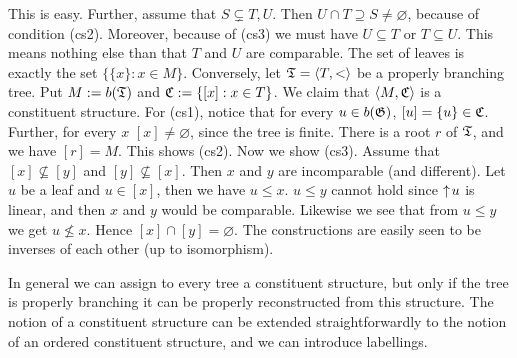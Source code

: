 This is easy. Further, assume that $S \subsetneq T, U$. Then
$U \cap T \supseteq S \neq \varnothing$, because of condition (cs2).
Moreover, because of (cs3) we must have $U \subseteq T$ or $T \subseteq U$.
This means nothing else than that $T$ and $U$ are comparable. The set
of leaves is exactly the set $\{\{x\} : x \in M\}$. Conversely, let
$\mathfrak{T} = \langle T, <\rangle$ be a properly branching tree. Put
$M := b(\mathfrak{T})$ and $\mathfrak{C} := \{[x] : x \in T\}$.  We claim that 
$\langle M, \mathfrak{C}\rangle$ is a constituent structure. For (cs1),
notice that for every $u \in b(\mathfrak{G})$, $[u] = \{u\} \in \mathfrak{C}$.
Further, for every $x$ $[x] \neq \varnothing$, since the tree is finite.
There is a root $r$ of $\mathfrak{T}$, and we have $[r] = M$. This shows
(cs2). Now we show (cs3). Assume that $[x] \nsubseteq [y]$ and
$[y] \nsubseteq [x]$. Then $x$ and $y$ are incomparable (and
different). Let $u$ be a leaf and $u \in [x]$, then we have $u \leq x$.
$u \leq y$ cannot hold since ${\uparrow\! u}$ is linear, and then
$x$ and $y$ would be comparable. Likewise we see that from
$u \leq y$ we get $u \nleq x$. Hence $[x] \cap [y] = \varnothing$.
The constructions are easily seen to be inverses of each other 
(up to isomorphism).
\proofend

In general we can assign to every tree a constituent structure,
but only if the tree is properly branching it can be properly
reconstructed from this structure. The notion of a constituent
structure can be extended straightforwardly to the notion of an 
ordered constituent structure, and we can introduce labellings. 

